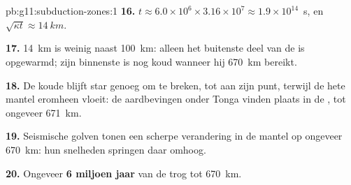 \begin{solution}{pb:g11:subduction-zones:1}
\textbf{16.} $t \approx 6.0 \times 10^6 \times 3.16 \times 10^7 \approx
1.9 \times 10^{14}$~s, en $\sqrt{\kappa t} \approx \qty{14}{km}$.

\textbf{17.} \qty{14}{km} is weinig naast \qty{100}{km}: alleen het buitenste deel
van de  is opgewarmd; zijn binnenste is nog koud wanneer hij
\qty{670}{km} bereikt.

\textbf{18.} De koude  blijft star genoeg om te breken, tot aan zijn punt,
terwijl de hete mantel eromheen vloeit: de aardbevingen onder Tonga vinden plaats
in de , tot ongeveer \qty{671}{km}.

\textbf{19.} Seismische golven tonen een scherpe verandering in de mantel op ongeveer
\qty{670}{km}: hun snelheden springen daar omhoog.

\textbf{20.} Ongeveer \textbf{6 miljoen jaar} van de trog tot
\qty{670}{km}.
\end{solution}
